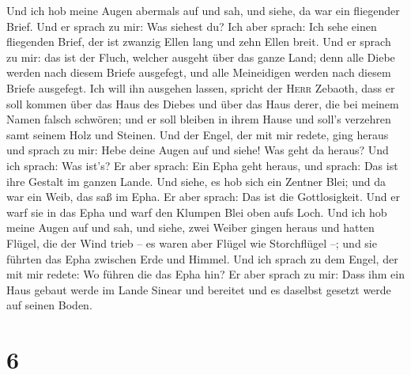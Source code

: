 Und ich hob meine Augen abermals auf und sah, und siehe,
da war ein fliegender Brief.  Und er sprach zu mir: Was
siehest du? Ich aber sprach: Ich sehe einen fliegenden Brief, der ist
zwanzig Ellen lang und zehn Ellen breit.  Und er sprach zu
mir: das ist der Fluch, welcher ausgeht über das ganze Land; denn alle
Diebe werden nach diesem Briefe ausgefegt, und alle Meineidigen werden
nach diesem Briefe ausgefegt.  Ich will ihn ausgehen
lassen, spricht der \textsc{Herr} Zebaoth, dass er soll kommen über das
Haus des Diebes und über das Haus derer, die bei meinem Namen falsch
schwören; und er soll bleiben in ihrem Hause und soll's verzehren samt
seinem Holz und Steinen.  Und der Engel, der mit mir
redete, ging heraus und sprach zu mir: Hebe deine Augen auf und siehe!
Was geht da heraus?  Und ich sprach: Was ist's? Er aber
sprach: Ein Epha geht heraus, und sprach: Das ist ihre Gestalt im ganzen
Lande.  Und siehe, es hob sich ein Zentner Blei; und da
war ein Weib, das saß im Epha.  Er aber sprach: Das ist
die Gottlosigkeit. Und er warf sie in das Epha und warf den Klumpen Blei
oben aufs Loch.  Und ich hob meine Augen auf und sah, und
siehe, zwei Weiber gingen heraus und hatten Flügel, die der Wind trieb
-- es waren aber Flügel wie Storchflügel --; und sie führten das Epha
zwischen Erde und Himmel.  Und ich sprach zu dem Engel,
der mit mir redete: Wo führen die das Epha hin?  Er aber
sprach zu mir: Dass ihm ein Haus gebaut werde im Lande Sinear und
bereitet und es daselbst gesetzt werde auf seinen Boden.

\hypertarget{section-5}{%
\section{6}\label{section-5}}

